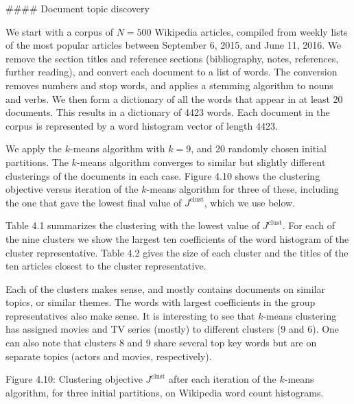 

#### Document topic discovery

We start with a corpus of \(N=500\) Wikipedia articles, compiled from weekly lists of the most popular articles between September 6, 2015, and June 11, 2016. We remove the section titles and reference sections (bibliography, notes, references, further reading), and convert each document to a list of words. The conversion removes numbers and stop words, and applies a stemming algorithm to nouns and verbs. We then form a dictionary of all the words that appear in at least 20 documents. This results in a dictionary of 4423 words. Each document in the corpus is represented by a word histogram vector of length 4423.

We apply the \(k\)-means algorithm with \(k=9\), and 20 randomly chosen initial partitions. The \(k\)-means algorithm converges to similar but slightly different clusterings of the documents in each case. Figure 4.10 shows the clustering objective versus iteration of the \(k\)-means algorithm for three of these, including the one that gave the lowest final value of \(J^{\mathrm{clust}}\), which we use below.

Table 4.1 summarizes the clustering with the lowest value of \(J^{\mathrm{clust}}\). For each of the nine clusters we show the largest ten coefficients of the word histogram of the cluster representative. Table 4.2 gives the size of each cluster and the titles of the ten articles closest to the cluster representative.

Each of the clusters makes sense, and mostly contains documents on similar topics, or similar themes. The words with largest coefficients in the group representatives also make sense. It is interesting to see that \(k\)-means clustering has assigned movies and TV series (mostly) to different clusters (9 and 6). One can also note that clusters 8 and 9 share several top key words but are on separate topics (actors and movies, respectively).

Figure 4.10: Clustering objective \(J^{\mathrm{clust}}\) after each iteration of the \(k\)-means algorithm, for three initial partitions, on Wikipedia word count histograms.

